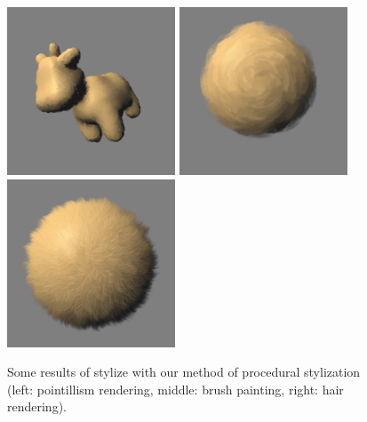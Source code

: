 \begin{figure}[H]
    \begin{center}
    \includegraphics[width=50mm, height=50mm]{Resultats/spotPoint/final.png}
    \includegraphics[width=50mm, height=50mm]{Resultats/painting1/final.png}
    \includegraphics[width=50mm, height=50mm]{Resultats/bouledepoil1/final.png}
    \end{center}
    \caption{Some results of stylize with our method of procedural stylization (left: pointillism rendering, middle: brush painting, right: hair rendering).}
    \label{some_results}
\end{figure}
